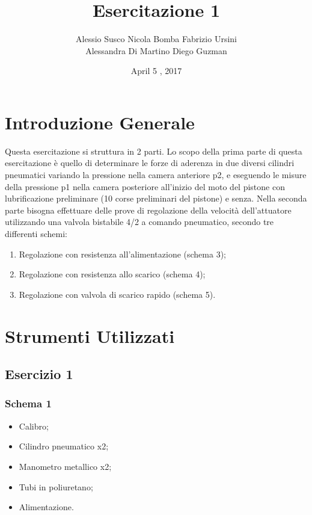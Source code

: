 \documentclass[a4paper]{article}
\begin{document}
\title{Esercitazione 1}
\date{April 5 , 2017}
\maketitle


\author{Alessio Susco \hspace*{2cm} Nicola Bomba \hspace*{2cm} Fabrizio Ursini  \\  \hspace*{1,85cm} Alessandra Di Martino \hspace*{1,25cm} Diego Guzman}

 

\tableofcontents

\clearpage

\section{Introduzione Generale}
Questa esercitazione si struttura in 2 parti.
Lo scopo della prima parte di questa esercitazione è quello di determinare le forze di aderenza in due diversi cilindri pneumatici variando la pressione nella camera anteriore p2, e eseguendo le misure della pressione p1 nella camera posteriore all'inizio del moto del pistone con lubrificazione preliminare (10 corse preliminari del pistone) e senza.
Nella seconda parte bisogna effettuare delle prove di regolazione della velocità dell'attuatore utilizzando una valvola bistabile 4/2 a comando pneumatico, secondo tre differenti schemi:

\begin{enumerate}
\item Regolazione con resistenza all'alimentazione (schema 3);
\item Regolazione con resistenza allo scarico (schema 4);
\item Regolazione con valvola di scarico rapido (schema 5).
\end{enumerate}

\section{Strumenti Utilizzati}

\subsection{Esercizio 1}
\subsubsection{Schema 1}
\begin{itemize}
\item Calibro;
\item Cilindro pneumatico x2;
\item Manometro metallico x2;
\item Tubi in poliuretano;
\item Alimentazione.
\end{itemize}
\end{document}
